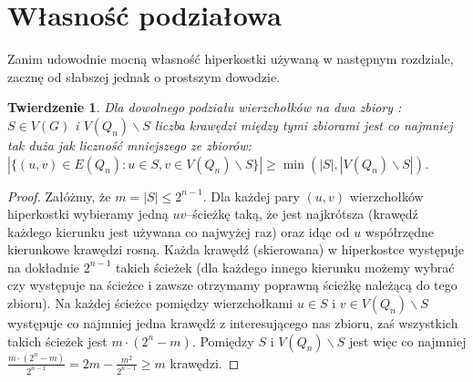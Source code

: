 \documentclass{pracamgr}
\newtheorem{theorem}{Twierdzenie}[chapter]
\begin{document}
  \section{Własność podziałowa}
   Zanim udowodnie mocną własność hiperkostki używaną w następnym rozdziale, zacznę od słabszej jednak o prostszym dowodzie.
   \begin{theorem}\label{wlasnosc podzialowa}
    Dla dowolnego podziału wierzchołków na dwa zbiory : $S\in V(G)$ i $V(Q_n)\backslash S$
    liczba krawędzi między tymi zbiorami jest co najmniej tak duża jak liczność mniejszego ze zbiorów:
    $|\{(u,v)\in E(Q_n):u\in S,v\in V(Q_n)\backslash S\}|\ge\min(|S|,|V(Q_n)\backslash S|)$.
   \end{theorem}
   \begin{proof}
    Załóżmy, że $m=|S|\le 2^{n-1}$.\newline
    Dla każdej pary $(u,v)$ wierzchołków hiperkostki wybieramy jedną $uv$--ścieżkę taką, że jest najkrótsza
    (krawędź każdego kierunku jest używana co najwyżej raz) oraz idąc od $u$ współrzędne kierunkowe krawędzi rosną.
    Każda krawędź (skierowana) w hiperkostce występuje na dokładnie $2^{n-1}$ takich ścieżek
    (dla każdego innego kierunku możemy wybrać czy występuje na ścieżce i zawsze otrzymamy poprawną ścieżkę należącą do tego zbioru).
    Na każdej ścieżce pomiędzy wierzchołkami $u\in S$ i $v\in V(Q_n)\backslash S$ występuje co najmniej jedna krawędź z interesującego nas zbioru,
    zaś wszystkich takich ścieżek jest $m\cdot(2^n-m)$. Pomiędzy $S$ i $V(Q_n)\backslash S$ jest więc co najmniej
    $\frac{m\cdot(2^n-m)}{2^{n-1}}=2m-\frac{m^2}{2^{n-1}}\ge m$ krawędzi. 
   \end{proof}
\end{document}
